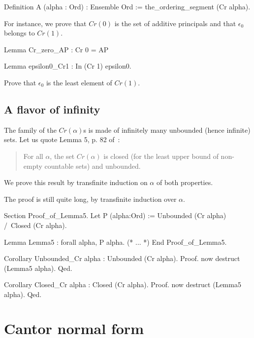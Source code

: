 {\begin{Coqsrc}
Definition A (alpha : Ord) : Ensemble Ord :=
  the_ordering_segment (Cr alpha).
\end{Coqsrc}

For instance,  we prove that $\textit{Cr}(0)$ is the set of additive principals and that $\epsilon_0$
belongs to $\textit{Cr}(1)$.

\begin{Coqsrc}
Lemma Cr_zero_AP :  Cr 0 = AP

Lemma epsilon0_Cr1 : In (Cr 1) epsilon0.
\end{Coqsrc}


\begin{exercise}
 Prove that $\epsilon_0$ is the least element of $\textit{Cr}(1)$.
\end{exercise}


\subsection{A flavor of infinity}



The family of the $\textit{Cr}(\alpha)$s is made of infinitely many unbounded (hence infinite) sets.
Let us quote Lemma 5, p. 82  of~\cite{schutte}:
\begin{quote}
  For all $\alpha$, the set $\textit{Cr}(\alpha)$ is closed (for the least upper bound of non-empty countable sets) and unbounded.
\end{quote}

We prove this result by transfinite induction on $\alpha$ of both properties.

The proof is still quite long, by transfinite induction over $\alpha$.



\begin{Coqsrc}
Section Proof_of_Lemma5.
  Let P (alpha:Ord) := Unbounded (Cr alpha) /\ Closed (Cr alpha).
 
 Lemma Lemma5 : forall alpha, P alpha.
(* ... *)
 End Proof_of_Lemma5.

Corollary Unbounded_Cr alpha : Unbounded (Cr alpha).
Proof.
  now destruct (Lemma5 alpha).
Qed.

Corollary Closed_Cr alpha : Closed (Cr alpha).
Proof.
  now destruct (Lemma5 alpha).
Qed.
\end{Coqsrc}

\section{Cantor normal form}

}
